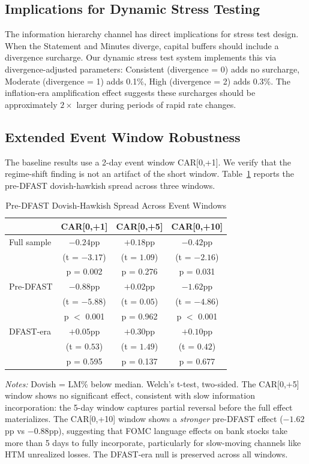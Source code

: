 \documentclass[12pt,a4paper]{article}
\begin{document}
\subsection{Implications for Dynamic Stress Testing}

The information hierarchy channel has direct implications for stress test design. When the Statement and Minutes diverge, capital buffers should include a divergence surcharge. Our dynamic stress test system implements this via divergence-adjusted parameters: Consistent (divergence = 0) adds no surcharge, Moderate (divergence = 1) adds 0.1\%, High (divergence = 2) adds 0.3\%. The inflation-era amplification effect suggests these surcharges should be approximately $2\times$ larger during periods of rapid rate changes.

\subsection{Extended Event Window Robustness}

The baseline results use a 2-day event window CAR[0,+1]. We verify that the regime-shift finding is not an artifact of the short window. Table~\ref{tab:car_window} reports the pre-DFAST dovish-hawkish spread across three windows.

\begin{table}[H]
\centering
\caption{Pre-DFAST Dovish-Hawkish Spread Across Event Windows}
\label{tab:car_window}
\small
\begin{tabular}{lccc}
\toprule
 & CAR[0,+1] & CAR[0,+5] & CAR[0,+10] \\
\midrule
Full sample & $-0.24$pp & $+0.18$pp & $-0.42$pp \\
 & (t = $-3.17$) & (t = $1.09$) & (t = $-2.16$) \\
 & p = 0.002 & p = 0.276 & p = 0.031 \\
\midrule
Pre-DFAST & $-0.88$pp & $+0.02$pp & $-1.62$pp \\
 & (t = $-5.88$) & (t = $0.05$) & (t = $-4.86$) \\
 & p $<$ 0.001 & p = 0.962 & p $<$ 0.001 \\
\midrule
DFAST-era & $+0.05$pp & $+0.30$pp & $+0.10$pp \\
 & (t = $0.53$) & (t = $1.49$) & (t = $0.42$) \\
 & p = 0.595 & p = 0.137 & p = 0.677 \\
\bottomrule
\end{tabular}
\end{table}
\noindent\textit{Notes:} Dovish = LM\% below median. Welch's t-test, two-sided. The CAR[0,+5] window shows no significant effect, consistent with slow information incorporation: the 5-day window captures partial reversal before the full effect materializes. The CAR[0,+10] window shows a \textit{stronger} pre-DFAST effect ($-1.62$pp vs $-0.88$pp), suggesting that FOMC language effects on bank stocks take more than 5 days to fully incorporate, particularly for slow-moving channels like HTM unrealized losses. The DFAST-era null is preserved across all windows.
\end{document}
